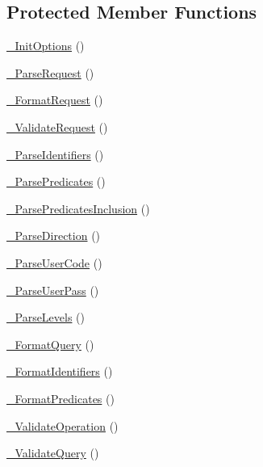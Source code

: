 \subsection*{Protected Member Functions}
\begin{DoxyCompactItemize}
\item 
\hyperlink{class_c_warehouse_wrapper_a8dd1de1d5595647b0999ffa6b658c605}{\-\_\-\-Init\-Options} ()
\item 
\hyperlink{class_c_warehouse_wrapper_aab6f377ec08fc5f868a5ad65691964f6}{\-\_\-\-Parse\-Request} ()
\item 
\hyperlink{class_c_warehouse_wrapper_a4bd0282949f52ce148b60218c48ddde5}{\-\_\-\-Format\-Request} ()
\item 
\hyperlink{class_c_warehouse_wrapper_a96537df2b42833302fb52de632a8f8f4}{\-\_\-\-Validate\-Request} ()
\item 
\hyperlink{class_c_warehouse_wrapper_a1a4497011e288b0134b1d43b6029914b}{\-\_\-\-Parse\-Identifiers} ()
\item 
\hyperlink{class_c_warehouse_wrapper_a77a135708bb63dad7b6f43b93f38b655}{\-\_\-\-Parse\-Predicates} ()
\item 
\hyperlink{class_c_warehouse_wrapper_ac85e601bd00d2fa1c6ac1e9954d86e27}{\-\_\-\-Parse\-Predicates\-Inclusion} ()
\item 
\hyperlink{class_c_warehouse_wrapper_a675e18a0cae0a2050159b608c81e69b1}{\-\_\-\-Parse\-Direction} ()
\item 
\hyperlink{class_c_warehouse_wrapper_aeb1488dd1ab1e8494caff8f920b32ad7}{\-\_\-\-Parse\-User\-Code} ()
\item 
\hyperlink{class_c_warehouse_wrapper_a31f33bdb468cf377df7ac4c6d5496a95}{\-\_\-\-Parse\-User\-Pass} ()
\item 
\hyperlink{class_c_warehouse_wrapper_a687876da8f0dd0d0abb839b2b135ccbe}{\-\_\-\-Parse\-Levels} ()
\item 
\hyperlink{class_c_warehouse_wrapper_aa88d34fb335682cde5e4574edc7d8017}{\-\_\-\-Format\-Query} ()
\item 
\hyperlink{class_c_warehouse_wrapper_a728b298fc1f647792efb5bee38194a8a}{\-\_\-\-Format\-Identifiers} ()
\item 
\hyperlink{class_c_warehouse_wrapper_aa8f737fd107082e69ba1d82c228a9864}{\-\_\-\-Format\-Predicates} ()
\item 
\hyperlink{class_c_warehouse_wrapper_ab9506f24cc7dd6b001991f83bd2b5d55}{\-\_\-\-Validate\-Operation} ()
\item 
\hyperlink{class_c_warehouse_wrapper_a7256b512c0210220b30ae0c65250d748}{\-\_\-\-Validate\-Query} ()

\end{DoxyCompactItemize}
